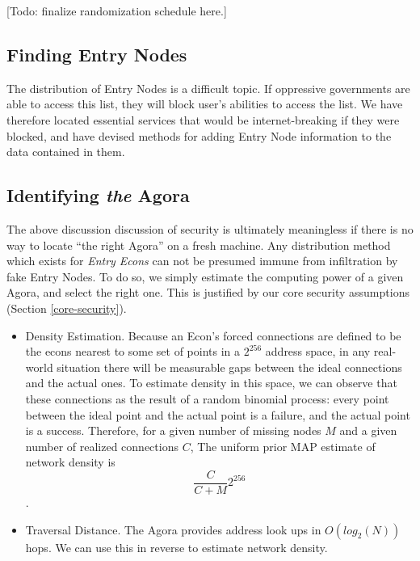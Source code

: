 \documentclass{article}
\begin{document}
[Todo: finalize randomization schedule here.]

\subsection{Finding Entry Nodes}

The distribution of Entry Nodes is a difficult topic. If oppressive governments are able to access this list, they will block user's abilities to access the list. We have therefore located essential services that would be internet-breaking if they were blocked, and have devised methods for adding Entry Node information to the data contained in them.

\subsection{Identifying \emph{the} Agora}

The above discussion discussion of security is ultimately meaningless if there is no way to locate ``the right Agora'' on a fresh machine. Any distribution method which exists for \emph{Entry Econs} can not be presumed immune from infiltration by fake Entry Nodes. To do so, we simply estimate the computing power of a given Agora, and select the right one. This is justified by our core security assumptions (Section \ref{core-security}).

\begin{itemize}
    \item Density Estimation. Because an Econ's forced connections are defined to be the econs nearest to some set of points in a $2^{256}$ address space, in any real-world situation there will be measurable gaps between the ideal connections and the actual ones. To estimate density in this space, we can observe that these connections as the result of a random binomial process: every point between the ideal point and the actual point is a failure, and the actual point is a success. Therefore, for a given number of missing nodes $M$ and a given number of realized connections $C$, The uniform prior MAP estimate of network density is $$\frac{C}{C + M} 2^{256}$$.
    \item Traversal Distance. The Agora provides address look ups in $O(log_2(N))$ hops. We can use this in reverse to estimate network density.
\end{itemize}
\end{document}
